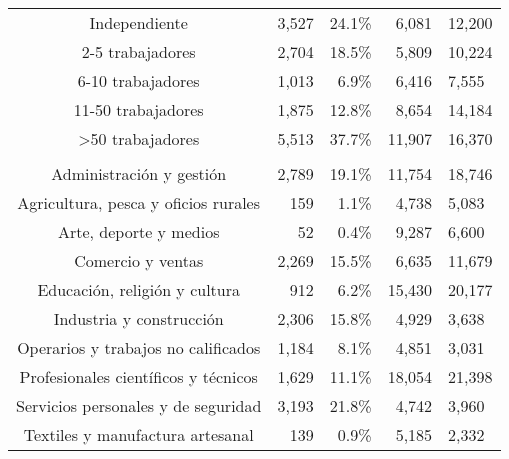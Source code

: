 \begin{longtable}{crrrl}
\midrule\addlinespace[2.5pt]
Independiente & 3,527 & 24.1\% &  6,081 & 12,200 \\ 
2-5 trabajadores & 2,704 & 18.5\% &  5,809 & 10,224 \\ 
6-10 trabajadores & 1,013 &  6.9\% &  6,416 &  7,555 \\ 
11-50 trabajadores & 1,875 & 12.8\% &  8,654 & 14,184 \\ 
>50 trabajadores & 5,513 & 37.7\% & 11,907 & 16,370 \\ 
\midrule\addlinespace[2.5pt]
\multicolumn{5}{l}{{\bfseries Oficio}} \\[2.5pt] 
\midrule\addlinespace[2.5pt]
Administración y gestión & 2,789 & 19.1\% & 11,754 & 18,746 \\ 
Agricultura, pesca y oficios rurales &   159 &  1.1\% &  4,738 &  5,083 \\ 
Arte, deporte y medios &    52 &  0.4\% &  9,287 &  6,600 \\ 
Comercio y ventas & 2,269 & 15.5\% &  6,635 & 11,679 \\ 
Educación, religión y cultura &   912 &  6.2\% & 15,430 & 20,177 \\ 
Industria y construcción & 2,306 & 15.8\% &  4,929 &  3,638 \\ 
Operarios y trabajos no calificados & 1,184 &  8.1\% &  4,851 &  3,031 \\ 
Profesionales científicos y técnicos & 1,629 & 11.1\% & 18,054 & 21,398 \\ 
Servicios personales y de seguridad & 3,193 & 21.8\% &  4,742 &  3,960 \\ 
Textiles y manufactura artesanal &   139 &  0.9\% &  5,185 &  2,332 \\ 
\bottomrule
\end{longtable}
\endgroup

